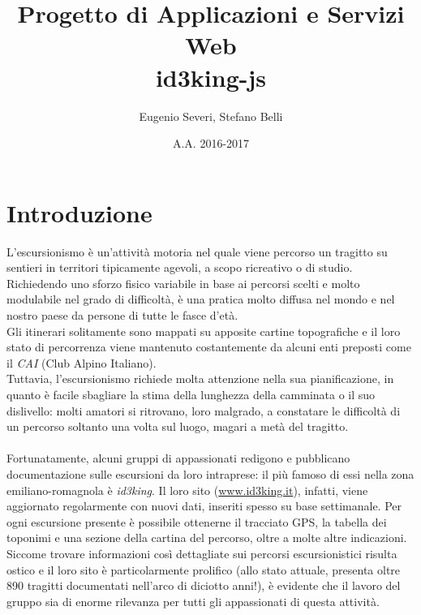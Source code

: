 \documentclass[11pt]{report}
\begin{document}
\title{Progetto di Applicazioni e Servizi Web\\id3king-js}
\author{Eugenio Severi, Stefano Belli}
\date{A.A. 2016-2017}
\begin{titlepage}
	\maketitle
\end{titlepage}

\setcounter{chapter}{1}
\section{Introduzione}
L'escursionismo è un'attività motoria nel quale viene percorso un tragitto su sentieri in territori tipicamente agevoli, a scopo ricreativo o di studio.
\\Richiedendo uno sforzo fisico variabile in base ai percorsi scelti e molto modulabile nel grado di difficoltà, è una pratica molto diffusa nel mondo e nel nostro paese da persone di tutte le fasce d'età.
\\Gli itinerari solitamente sono mappati su apposite cartine topografiche e il loro stato di percorrenza viene mantenuto costantemente da alcuni enti preposti come il \textit{CAI} (Club Alpino Italiano).
\\Tuttavia, l'escursionismo richiede molta attenzione nella sua pianificazione, in quanto è facile sbagliare la stima della lunghezza della camminata o il suo dislivello:
molti amatori si ritrovano, loro malgrado, a constatare le difficoltà di un percorso soltanto una volta sul luogo, magari a metà del tragitto.
\\\\Fortunatamente, alcuni gruppi di appassionati redigono e pubblicano documentazione sulle escursioni da loro intraprese: il più famoso di essi nella zona emiliano-romagnola è \textit{id3king}.
Il loro sito (\url{www.id3king.it}), infatti, viene aggiornato regolarmente con nuovi dati, inseriti spesso su base settimanale.
Per ogni escursione presente è possibile ottenerne il tracciato GPS, la tabella dei toponimi e una sezione della cartina del percorso, oltre a molte altre indicazioni.
\\Siccome trovare informazioni così dettagliate sui percorsi escursionistici risulta ostico e il loro sito è particolarmente prolifico (allo stato attuale, presenta oltre 890 tragitti documentati nell'arco di diciotto anni!), è evidente che il lavoro del gruppo sia di enorme rilevanza per tutti gli appassionati di questa attività.
\end{document}
